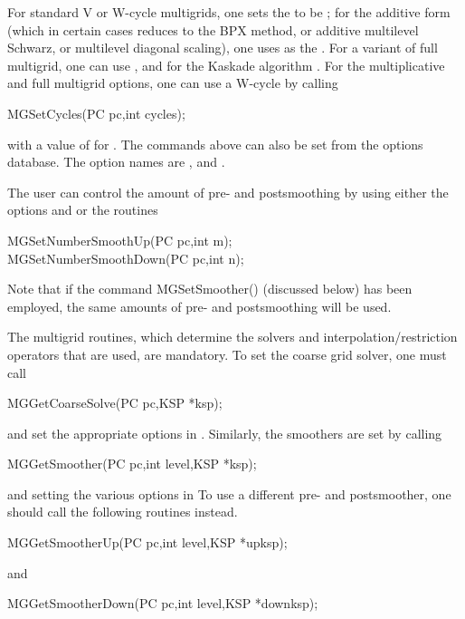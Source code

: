 For standard V or W-cycle multigrids, one sets the  to be  ; for the
additive form (which in certain cases reduces to the BPX method, or additive 
multilevel Schwarz, or multilevel diagonal scaling), one uses
  as the .  For a variant
of full multigrid, one can
 use  , and for the Kaskade 
algorithm  .
For the multiplicative and full multigrid options, one can use a
W-cycle by   calling
 
\begin{tabbing}
  MGSetCycles(PC pc,int cycles);
\end{tabbing}
with a value of  for . 
The commands above can also be set from the options database. The option 
names are ,
and  .  

The user can control the amount of pre- and postsmoothing 
  by using
either the options  
  and   or
the routines  
\begin{tabbing}
  MGSetNumberSmoothUp(PC pc,int m);\\
  MGSetNumberSmoothDown(PC pc,int n);
\end{tabbing}
Note that if the command MGSetSmoother() (discussed below) has
 been employed, the same amounts of pre-
and postsmoothing will be used.

The multigrid routines, which determine
the solvers and interpolation/restriction operators that are used,
are mandatory.
To set the coarse grid solver, one must 
call 
\begin{tabbing}
  MGGetCoarseSolve(PC pc,KSP *ksp);
\end{tabbing}
and set the appropriate options in . Similarly, the 
smoothers are set by calling 
\begin{tabbing}
  MGGetSmoother(PC pc,int level,KSP *ksp);
\end{tabbing}
and setting the various options in  
To use a different pre- and postsmoother, one should call the following
routines instead.
\begin{tabbing}
  MGGetSmootherUp(PC pc,int level,KSP *upksp);
\end{tabbing}
and 
\begin{tabbing}
  MGGetSmootherDown(PC pc,int level,KSP *downksp);
\end{tabbing}

